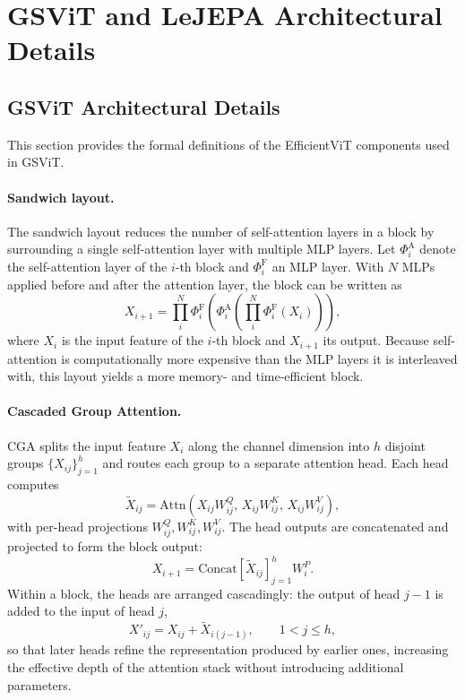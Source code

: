 \documentclass[11pt, a4paper]{article}
\begin{document}
\newpage
\printbibliography

\appendix
\section{GSViT and LeJEPA Architectural Details}\label{app:a}
\subsection*{GSViT Architectural Details}

This section provides the formal definitions of the EfficientViT components used in GSViT.

\paragraph{Sandwich layout.} The sandwich layout reduces the number of self-attention layers in a block by surrounding a single self-attention layer with multiple MLP layers. Let $\Phi_i^{\mathrm{A}}$ denote the self-attention layer of the $i$-th block and $\Phi_i^{\mathrm{F}}$ an MLP layer. With $N$ MLPs applied before and after the attention layer, the block can be written as
\begin{equation}
X_{i+1} = \prod_{i}^{N} \Phi_i^{\mathrm{F}}\!\left(\Phi_i^{\mathrm{A}}\!\left(\prod_{i}^{N} \Phi_i^{\mathrm{F}}(X_i)\right)\right),
\end{equation}
where $X_i$ is the input feature of the $i$-th block and $X_{i+1}$ its output. Because self-attention is computationally more expensive than the MLP layers it is interleaved with, this layout yields a more memory- and time-efficient block.

\paragraph{Cascaded Group Attention.} CGA splits the input feature $X_i$ along the channel dimension into $h$ disjoint groups $\{X_{ij}\}_{j=1}^{h}$ and routes each group to a separate attention head. Each head computes
\begin{equation}
\tilde{X}_{ij} = \mathrm{Attn}\!\left(X_{ij} W^{Q}_{ij},\, X_{ij} W^{K}_{ij},\, X_{ij} W^{V}_{ij}\right),
\end{equation}
with per-head projections $W^{Q}_{ij}, W^{K}_{ij}, W^{V}_{ij}$. The head outputs are concatenated and projected to form the block output:
\begin{equation}
X_{i+1} = \mathrm{Concat}\!\left[\tilde{X}_{ij}\right]_{j=1}^{h} W^{P}_{i}.
\end{equation}
Within a block, the heads are arranged cascadingly: the output of head $j-1$ is added to the input of head $j$,
\begin{equation}
X'_{ij} = X_{ij} + \tilde{X}_{i(j-1)}, \qquad 1 < j \leq h,
\end{equation}
so that later heads refine the representation produced by earlier ones, increasing the effective depth of the attention stack without introducing additional parameters.
\end{document}
